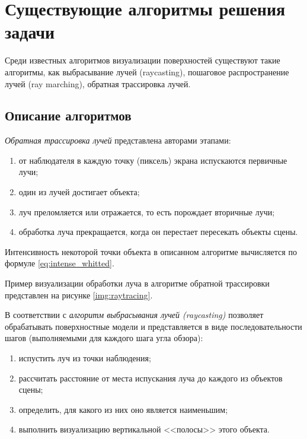 \section{Существующие алгоритмы решения задачи}

Среди известных алгоритмов визуализации поверхностей существуют такие алгоритмы, как выбрасывание лучей (raycasting), пошаговое распространение лучей (ray marching), обратная трассировка лучей.

\subsection{Описание алгоритмов}

\textit{Обратная трассировка лучей} представлена авторами \cite{порев2002компьютерная} этапами:
\begin{enumerate}
	\item от наблюдателя в каждую точку (пиксель) экрана испускаются первичные лучи;
	\item один из лучей достигает объекта;
	\item луч преломляется или отражается, то есть порождает вторичные лучи;
	\item обработка луча прекращается, когда он перестает пересекать объекты сцены.
\end{enumerate}

Интенсивность некоторой точки объекта в описанном алгоритме вычисляется по формуле \ref{eq:intense_whitted}.

Пример визуализации обработки луча в алгоритме обратной трассировки представлен на рисунке \ref{img:raytracing}.


В соответствии с \cite{евстратов2020создание} \textit{алгоритм выбрасывания лучей (raycasting)} позволяет обрабатывать поверхностные модели и представляется в виде последовательности шагов (выполняемыми для каждого шага угла обзора):
\begin{enumerate}
	\item испустить луч из точки наблюдения;
	\item рассчитать расстояние от места испускания луча до каждого из объектов сцены;
	\item определить, для какого из них оно является наименьшим;
	\item выполнить визуализацию вертикальной <<полосы>> этого объекта.
\end{enumerate}

